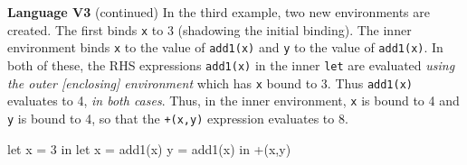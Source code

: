 \begin{minipage}[t]{\sw}
\slidenumber
\LARGE
{\bf Language V3} (continued)\exx
In the third example, two new environments are created.
The first binds \verb'x' to 3 (shadowing the initial binding).
The inner environment binds \verb'x'
to the value of \verb'add1(x)'
and \verb'y' to the value of \verb'add1(x)'.
In both of these,
the RHS expressions \verb'add1(x)' in the inner \verb'let'
are evaluated {\em using the outer [enclosing] environment}
which has \verb'x' bound to 3.
Thus \verb'add1(x)' evaluates to 4, {\em in both cases}.
Thus, in the inner environment,
\verb'x' is bound to 4 and \verb'y' is bound to 4,
so that the \verb'+(x,y)' expression evaluates to 8.
\begin{qv}
let x = 3
in
  let
    x = add1(x)
    y = add1(x)
  in
    +(x,y)
\end{qv}
\large
\end{minipage}
